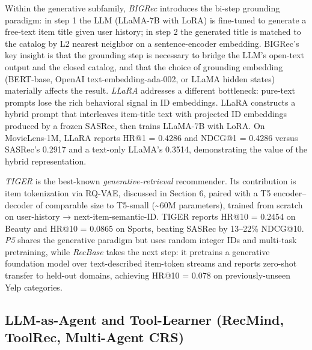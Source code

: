 \documentclass{article}
\begin{document}
Within the generative subfamily, \emph{BIGRec} \citep{bao2023arxiv2305004472023} introduces the bi-step grounding paradigm: in step 1 the LLM (LLaMA-7B with LoRA) is fine-tuned to generate a free-text item title given user history; in step 2 the generated title is matched to the catalog by L2 nearest neighbor on a sentence-encoder embedding. BIGRec's key insight is that the grounding step is necessary to bridge the LLM's open-text output and the closed catalog, and that the choice of grounding embedding (BERT-base, OpenAI text-embedding-ada-002, or LLaMA hidden states) materially affects the result. \emph{LLaRA} \citep{liao2024llaralargelanguage} addresses a different bottleneck: pure-text prompts lose the rich behavioral signal in ID embeddings. LLaRA constructs a hybrid prompt that interleaves item-title text with projected ID embeddings produced by a frozen SASRec, then trains LLaMA-7B with LoRA. On MovieLens-1M, LLaRA reports HR@1 = 0.4286 and NDCG@1 = 0.4286 versus SASRec's 0.2917 and a text-only LLaMA's 0.3514, demonstrating the value of the hybrid representation.

\emph{TIGER} \citep{rajput2023recommendersystems} is the best-known \emph{generative-retrieval} recommender. Its contribution is item tokenization via RQ-VAE, discussed in Section 6, paired with a T5 encoder--decoder of comparable size to T5-small (\textasciitilde60M parameters), trained from scratch on user-history → next-item-semantic-ID. TIGER reports HR@10 = 0.2454 on Beauty and HR@10 = 0.0865 on Sports, beating SASRec by 13--22\% NDCG@10. \emph{P5} \citep{geng2022recsys2022} shares the generative paradigm but uses random integer IDs and multi-task pretraining, while \emph{RecBase} \citep{zhou2025recbasegenerativef} takes the next step: it pretrains a generative foundation model over text-described item-token streams and reports zero-shot transfer to held-out domains, achieving HR@10 = 0.078 on previously-unseen Yelp categories.

\subsection{LLM-as-Agent and Tool-Learner (RecMind, ToolRec, Multi-Agent CRS)}\label{llm-as-agent-and-tool-learner-recmind-toolrec-multi-agent-crs}
\end{document}
